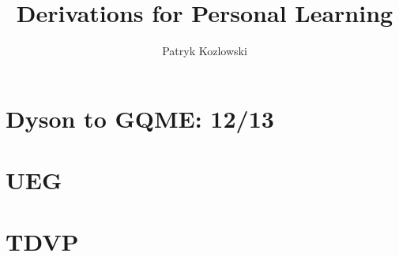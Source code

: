 \documentclass[12pt]{report}
\title{Derivations for Personal Learning}
\author{Patryk Kozlowski}
\begin{document}
\setcounter{tocdepth}{3}  %
\tableofcontents
\clearpage  %

\maketitle

% 
\chapter{Dyson to GQME: 12/13}

% 
% 
% 
% 
\chapter{UEG}

\chapter{TDVP}

% 
% 
% 
% 
% 




% 


\end{document}
